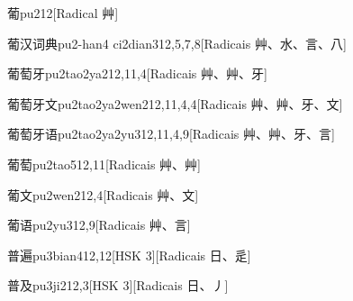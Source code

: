 \begin{entry}{葡}{pu2}{12}[Radical ⾋]
\end{entry}

\begin{entry}{葡汉词典}{pu2-han4 ci2dian3}{12,5,7,8}[Radicais ⾋、⽔、⾔、⼋]
\end{entry}

\begin{entry}{葡萄牙}{pu2tao2ya2}{12,11,4}[Radicais ⾋、⾋、⽛]
\end{entry}

\begin{entry}{葡萄牙文}{pu2tao2ya2wen2}{12,11,4,4}[Radicais ⾋、⾋、⽛、⽂]
\end{entry}

\begin{entry}{葡萄牙语}{pu2tao2ya2yu3}{12,11,4,9}[Radicais ⾋、⾋、⽛、⾔]
\end{entry}

\begin{entry}{葡萄}{pu2tao5}{12,11}[Radicais ⾋、⾋]
\end{entry}

\begin{entry}{葡文}{pu2wen2}{12,4}[Radicais ⾋、⽂]
\end{entry}

\begin{entry}{葡语}{pu2yu3}{12,9}[Radicais ⾋、⾔]
\end{entry}

\begin{entry}{普遍}{pu3bian4}{12,12}[HSK 3][Radicais ⽇、⾡]
\end{entry}

\begin{entry}{普及}{pu3ji2}{12,3}[HSK 3][Radicais ⽇、⼃]
\end{entry}

